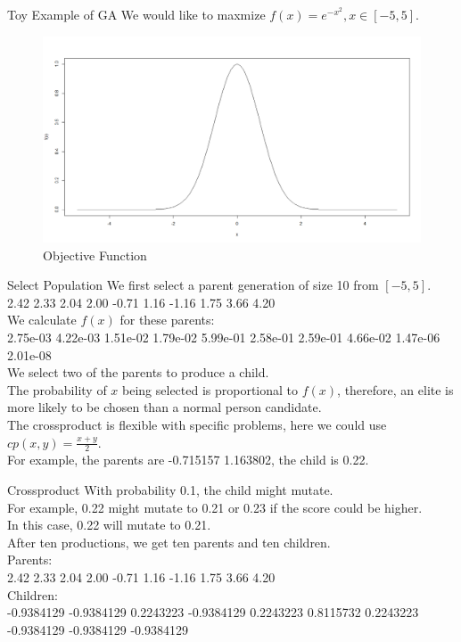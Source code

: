 \documentclass[xcolor=dvipsnames]{beamer}
\begin{document}
\begin{frame}{Toy Example of GA}
We would like to maxmize $f(x)=e^{-x^2}, x\in[-5,5]$.\\
\begin{figure}
\includegraphics[width=0.9\linewidth]{toyfunction.png}
\caption{Objective Function}
\end{figure}
\end{frame}
\begin{frame}{Select Population}
We first select a parent generation of size 10 from $[-5,5]$.\\
2.42  2.33  2.04  2.00 -0.71  1.16 -1.16  1.75  3.66  4.20\\
We calculate $f(x)$ for these parents:\\
2.75e-03 4.22e-03 1.51e-02 1.79e-02 5.99e-01 2.58e-01 2.59e-01 4.66e-02 1.47e-06 2.01e-08\\
We select two of the parents to produce a child.\\
The probability of $x$ being selected is proportional to $f(x)$, therefore, an elite is more likely to be chosen than a normal person candidate.\\
The crossproduct is flexible with specific problems, here we could use $cp(x,y)=\frac{x+y}{2}$.\\
For example, the parents are -0.715157  1.163802, the child is 0.22.\\
\end{frame}
\begin{frame}{Crossproduct}
With probability 0.1, the child might mutate.\\
For example, 0.22 might mutate to 0.21 or 0.23 if the score could be higher.\\
In this case, 0.22 will mutate to 0.21.\\
After ten productions, we get ten parents and ten children.\\
Parents:\\
2.42  2.33  2.04  2.00 -0.71  1.16 -1.16  1.75  3.66  4.20\\
Children:\\
-0.9384129 -0.9384129  0.2243223 -0.9384129  0.2243223  0.8115732  0.2243223 -0.9384129 -0.9384129 -0.9384129
\end{frame}
\end{document}
